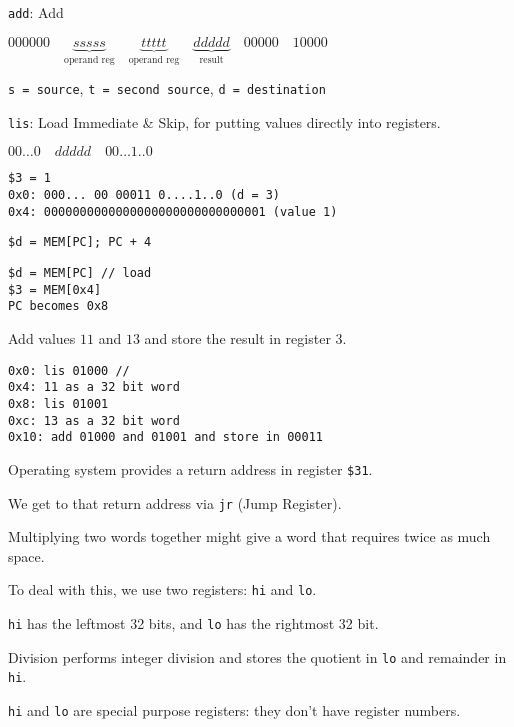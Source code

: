 \documentclass{article}
\begin{document}
\texttt{add}: Add

\(000000 \quad \underbrace{sssss}_{\text{operand reg}} \quad \underbrace{ttttt}_{\text{operand reg}} \quad \underbrace{ddddd}_{\text{result}} \quad 00000 \quad 10000\)

\texttt{s\ =\ source}, \texttt{t\ =\ second\ source},
\texttt{d\ =\ destination}

\texttt{lis}: Load Immediate \& Skip, for putting values directly into
registers.

\(00 \ldots 0 \quad ddddd \quad 00 \ldots 1..0\)

\begin{verbatim}
$3 = 1
0x0: 000... 00 00011 0....1..0 (d = 3)
0x4: 0000000000000000000000000000001 (value 1)
\end{verbatim}

\texttt{\$d\ =\ MEM{[}PC{]};\ PC\ +\ 4}

\begin{tcolorbox}
\begin{verbatim}
$d = MEM[PC] // load
$3 = MEM[0x4]
PC becomes 0x8
\end{verbatim}
\end{tcolorbox}

Add values \(11\) and \(13\) and store the result in register \(3\).

\begin{tcolorbox}
\begin{verbatim}
0x0: lis 01000 // 
0x4: 11 as a 32 bit word
0x8: lis 01001
0xc: 13 as a 32 bit word
0x10: add 01000 and 01001 and store in 00011
\end{verbatim}
\end{tcolorbox}


Operating system provides a return address in register \texttt{\$31}.

We get to that return address via \texttt{jr} (Jump Register).

Multiplying two words together might give a word that requires twice as
much space.

To deal with this, we use two registers: \texttt{hi} and \texttt{lo}.

\texttt{hi} has the leftmost 32 bits, and \texttt{lo} has the rightmost
32 bit.

Division performs integer division and stores the quotient in
\texttt{lo} and remainder in \texttt{hi}.

\texttt{hi} and \texttt{lo} are special purpose registers: they don't
have register numbers.
\end{document}
